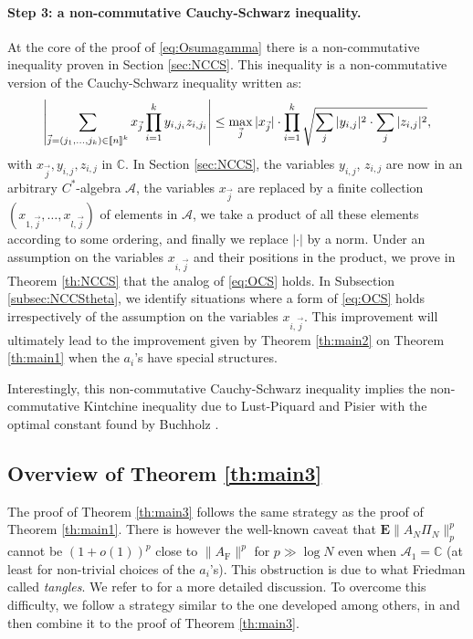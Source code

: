 \documentclass[11pt]{article}
\renewcommand{\star}{{\mathrm{F}}}
\newcommand{\cA}{\mathcal{A}}
\newcommand{\dE}{\mathbf {E}}
\newcommand{\dC}{\mathbb {C}}
\newcommand{\ABS}[1]{{{\left| #1 \right|}}} %
\newcommand{\1}{1\!\!{\sf I}}
\newcommand{\INT}[1]{{{\left[\hspace{-1.4pt}\left[#1\right]\hspace{-1.4pt}\right]}}}
\begin{document}
\paragraph{Step 3: a non-commutative Cauchy-Schwarz inequality. } At the core of the proof of \eqref{eq:Osumagamma} there is a non-commutative inequality proven in Section \ref{sec:NCCS}. This inequality is a non-commutative version of the Cauchy-Schwarz inequality written as: 
\begin{equation}\label{eq:OCS}
\ABS{ \sum_{\vec j = (j_1,\ldots,j_k) \in \INT{n}^k } x_{\vec j} \prod_{i=1}^k y_{i,j_i} z_{i,j_i}   } \leq \max_{\vec j} |x_{\vec j} |  \cdot \prod_{i=1}^k \sqrt{ \sum_{j} | y_{i,j}|^2  \cdot  \sum_{j} | z_{i,j}|^2  }, 
\end{equation}
with $x_{\vec j},y_{i,j},z_{i,j}$ in $\dC$. In Section \ref{sec:NCCS}, the variables $y_{i,j}$, $z_{i,j}$ are now in an arbitrary $C^*$-algebra $\cA$, the variables $x_{\vec j}$ are replaced by a finite collection $(x_{1,\vec j},\ldots,x_{l,\vec j})$ of elements in $\cA$, we take a product of all these elements according to some ordering, and finally we replace $\ABS{\cdot}$ by a norm. Under an assumption on the variables $x_{i,\vec j}$ and their positions in the product, we prove in Theorem \ref{th:NCCS}  that the analog of \eqref{eq:OCS} holds. In Subsection \ref{subsec:NCCStheta}, we identify situations where a form of \eqref{eq:OCS} holds irrespectively of the assumption on the variables $x_{i,\vec j}$. This improvement will ultimately lead to the improvement given by Theorem \ref{th:main2} on Theorem \ref{th:main1} when the $a_i$'s have special structures.

Interestingly, this non-commutative Cauchy-Schwarz inequality implies the non-commutative Kintchine inequality due to Lust-Piquard and Pisier \cite{MR1150376} with the optimal constant found by Buchholz \cite{MR1812816}.


\subsection{Overview of Theorem \ref{th:main3}}

The proof of Theorem \ref{th:main3} follows 
the same strategy as the proof of Theorem \ref{th:main1}. There is however the well-known caveat that $\dE \| A_N \Pi_N \|_p^p$ cannot be $(1+o(1))^p$ close to $\| A_\star  \|^p$ for $p \gg \log N$ even when $\cA_1 = \dC$ (at least for non-trivial choices of the $a_i$'s).   This obstruction is due to what Friedman \cite{MR2437174} called {\em tangles}. We refer to \cite[Subsection 4.1]{MR4024563} for a more detailed discussion. To overcome this difficulty, we follow a strategy similar to the one developed among others, in
\cite{M13,BLM,MR3792625,MR4024563} and then combine it to the proof of Theorem \ref{th:main3}.
\end{document}
